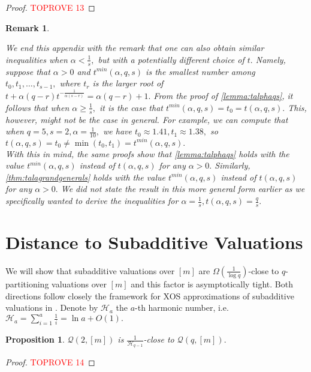 \documentclass[11pt]{article}\usepackage{amsfonts}
\newtheorem{remark}[theorem]{Remark}
\newtheorem{proposition}[theorem]{Proposition}
\numberwithin{theorem}{subsection}
\newcommand{\classqm}{\mathcal{Q}(q,[m])}
\begin{document}
\noindent
\begin{proof}\textcolor{red}{TOPROVE 13}\end{proof}

\begin{remark}
\label{rmk:alphalessthansiso}
\normalfont

We end this appendix with the remark that one can also obtain similar inequalities when $\alpha <\frac{1}{s},$ but with a potentially different choice of $t.$ Namely, suppose that $\alpha >0$ and $t^{min}(\alpha ,q,s)$ is the smallest number among $t_0,t_1,\ldots, t_{s-1},$ where $t_r$ is the larger root of\linebreak $t + \alpha (q-r)t^{-\frac{1}{\alpha (s-r)}} = \alpha (q-r)+1.$ From the proof of \cref{lemma:talphaqs}, it follows that 
when $\alpha \ge\frac{1}{s},$ it is the case that $t^{min}(\alpha ,q,s) =t_0 = t(\alpha, q, s).$ This, however, might not be the case in general. For example, we can compute that when $q = 5, s = 2, \alpha = \frac{1}{10},$
we have $t_0 \approx 1.41, t_1\approx 1.38,$ so $t(\alpha ,q,s) = t_0\neq \min(t_0,t_1) = t^{min}(\alpha,q,s).$\\
 
\noindent
With this in mind, the same proofs show that \cref{lemma:talphaqs} holds with the value $t^{min}(\alpha,q,s)$ instead of $t(\alpha,q,s)$ for any $\alpha >0.$ Similarly,
\cref{thm:talagrandgenerals} holds 
with the value $t^{min}(\alpha,q,s)$ instead of $t(\alpha,q,s)$ for any $\alpha >0.$ We did not state the result in this more general form earlier as we specifically wanted to derive the inequalities for $\alpha = \frac{1}{s}, t(\alpha,q,s) = \frac{q}{s}.$ 
\end{remark}
\section{Distance to Subadditive Valuations}
\label{section:closeness}
We will show that subadditive valuations over $[m]$ are $\Omega(\frac{1}{\log q})$-close to $q$-partitioning valuations over $[m]$ and this factor is asymptotically tight. Both directions follow closely the framework for XOS 
approximations of subadditive valuations in \cite{BhawalkarR11}. Denote by $\mathcal{H}_a$ the $a$-th harmonic number, i.e. $\displaystyle\mathcal{H}_a = \sum_{i = 1}^a\frac{1}{i} = \ln a + O(1).$

\noindent
\begin{proposition}
\label{lem:qparttosa}
 $\mathcal{Q}(2,[m])$ is $\frac{1}{\mathcal{H}_{q-1}}$-close to $\classqm.$
\end{proposition}
\begin{proof}\textcolor{red}{TOPROVE 14}\end{proof}
\end{document}

